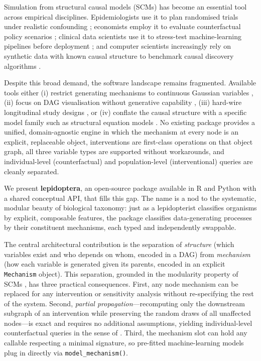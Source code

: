 \documentclass[12pt,a4paper]{article}
\newcommand{\pkg}[1]{\textbf{#1}}
\newcommand{\code}[1]{\texttt{#1}}
\begin{document}
Simulation from structural causal models (SCMs) has become an essential tool across empirical disciplines. Epidemiologists use it to plan randomised trials under realistic confounding \citep{hernan2020causal}; economists employ it to evaluate counterfactual policy scenarios \citep{angrist2009mostly}; clinical data scientists use it to stress-test machine-learning pipelines before deployment \citep{vanderschueren2023}; and computer scientists increasingly rely on synthetic data with known causal structure to benchmark causal discovery algorithms \citep{spirtes2000causation, glymour2019review}.

Despite this broad demand, the software landscape remains fragmented. Available tools either (i) restrict generating mechanisms to continuous Gaussian variables \citep{scutari2010bnlearn}, (ii) focus on DAG visualisation without generative capability \citep{textor2016dagitty}, (iii) hard-wire longitudinal study designs \citep{sofrygin2017simcausal}, or (iv) conflate the causal structure with a specific model family such as structural equation models \citep{holst2013lava, rosseel2012lavaan}. No existing package provides a unified, domain-agnostic engine in which the mechanism at every node is an explicit, replaceable object, interventions are first-class operations on that object graph, all three variable types are supported without workarounds, and individual-level (counterfactual) and population-level (interventional) queries are cleanly separated.

We present \pkg{lepidoptera}, an open-source package available in R and Python with a shared conceptual API, that fills this gap. The name is a nod to the systematic, modular beauty of biological taxonomy: just as a lepidopterist classifies organisms by explicit, composable features, the package classifies data-generating processes by their constituent mechanisms, each typed and independently swappable.

The central architectural contribution is the separation of \emph{structure} (which variables exist and who depends on whom, encoded in a DAG) from \emph{mechanism} (how each variable is generated given its parents, encoded in an explicit \code{Mechanism} object). This separation, grounded in the modularity property of SCMs \citep{pearl2009causality, peters2017elements}, has three practical consequences. First, any node mechanism can be replaced for any intervention or sensitivity analysis without re-specifying the rest of the system. Second, \emph{partial propagation}---recomputing only the downstream subgraph of an intervention while preserving the random draws of all unaffected nodes---is exact and requires no additional assumptions, yielding individual-level counterfactual queries in the sense of \citet{pearl2009causality}. Third, the mechanism slot can hold any callable respecting a minimal signature, so pre-fitted machine-learning models plug in directly via \code{model\_mechanism()}.
\end{document}
